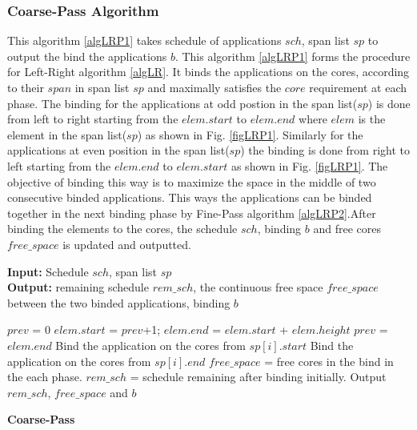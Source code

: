 \documentclass[10pt, conference]{IEEEtran}
\begin{document}
\subsubsection{Coarse-Pass Algorithm}
This algorithm \ref{algLRP1} takes schedule of applications $sch$, span list $sp$ to output the bind the applications $b$. This algorithm \ref{algLRP1} forms the procedure for Left-Right algorithm \ref{algLR}. It binds the applications on the cores, according to their $span$ in span list $sp$ and maximally satisfies the $core$ requirement at each phase. The binding for the applications at odd postion in the span list($sp$) is done from left to right starting from the $elem.start$ to $elem.end$ where $elem$ is the element in the span list($sp$) as shown in Fig. \ref{figLRP1}. Similarly for the applications at even position in the span list($sp$) the binding is done from right to left starting from the $elem.end$ to $elem.start$ as shown in Fig. \ref{figLRP1}. The objective of binding this way is to maximize the space in the middle of two consecutive binded applications. This ways the applications can be binded together in the next binding phase by Fine-Pass algorithm \ref{algLRP2}.After binding the elements to the cores, the schedule $sch$, binding $b$ and free cores$free\_space$ is updated and outputted.

\begin{algorithm}[tb]
\footnotesize
\textbf{Input:} Schedule $sch$, span list $sp$ \ \\
\textbf{Output:} remaining schedule $rem\_sch$, the continuous free space $free\_space$ between the two binded applications, binding $b$
\begin{algorithmic}[1]
\STATE  $prev$ = 0
\STATE $elem.start$ = $prev$+1; $elem.end$ = $elem.start$ + $elem.height$
\STATE $prev$ = $elem.end$
\ENDFOR    
{} 
\STATE Bind the application on the cores from $sp[i].start$
\ELSE   
\STATE Bind the application on the cores from $sp[i].end$
\ENDIF
\STATE $free\_space$ = free cores in the bind in the each phase.   
\STATE $rem\_sch$ = schedule remaining after binding initially.
\ENDFOR
\STATE Output $rem\_sch$, $free\_space$ and $b$
\end{algorithmic}
\caption{\textbf{Coarse-Pass}}
\vspace{-0.1cm}
\label{algLRP1}
\end{algorithm}

\end{document}
